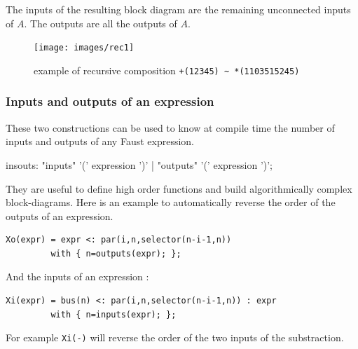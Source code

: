 The inputs of the resulting block diagram are the remaining unconnected inputs of $A$. The outputs are all the outputs of $A$.
 
\begin{figure}[h]
\centering 
\texttt{[image: images/rec1]} 
\caption{example of recursive composition \lstinline'+(12345) ~ *(1103515245)'}  
\label{figure:rec1}
\end{figure}

\subsubsection{Inputs and outputs of an expression}
These two constructions can be used to know at compile time the number of inputs and outputs of any Faust expression. 

\begin{rail}
insouts: "inputs" '(' expression ')'
       | "outputs" '(' expression ')';
\end{rail}

They are useful to define high order functions and build algorithmically complex block-diagrams. Here is an example to automatically reverse the order of the outputs of an expression.

\begin{lstlisting}
Xo(expr) = expr <: par(i,n,selector(n-i-1,n)) 
		 with { n=outputs(expr); };
\end{lstlisting}

And the inputs of an expression :

\begin{lstlisting}
Xi(expr) = bus(n) <: par(i,n,selector(n-i-1,n)) : expr 
		 with { n=inputs(expr); };
\end{lstlisting}

For example \lstinline'Xi(-)' will reverse the order of the two inputs of the substraction.




